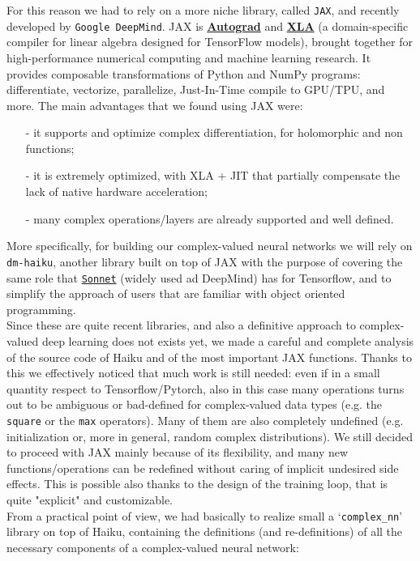 \documentclass[../main.tex]{subfiles}
\begin{document}
For this reason we had to rely on a more niche library, called \texttt{JAX}, and recently developed by \texttt{Google DeepMind}. JAX is \href{https://github.com/hips/autograd}{\textbf{Autograd}} and \href{https://www.tensorflow.org/xla}{\textbf{XLA}} (a domain-specific compiler for linear algebra designed for TensorFlow models), brought together for high-performance numerical computing and machine learning research. It provides composable transformations of Python and NumPy programs: differentiate, vectorize, parallelize, Just-In-Time compile to GPU/TPU, and more. The main advantages that we found using JAX were:
\begin{itemize}
	\item[-] it supports and optimize complex differentiation, for holomorphic and non functions;
	\item[-] it is extremely optimized, with XLA + JIT that partially compensate the lack of native hardware acceleration;
	\item[-] many complex operations/layers are already supported and well defined.
\end{itemize}
More specifically, for building our complex-valued neural networks we will rely on \texttt{dm-haiku}, another library built on top of JAX with the purpose of covering the same role that \href{https://github.com/deepmind/sonnet}{\texttt{Sonnet}} (widely used ad DeepMind) has for Tensorflow, and to simplify the approach of users that are familiar with object oriented programming.\\
Since these are quite recent libraries, and also a definitive approach to complex-valued deep learning does not exists yet, we made a careful and complete analysis of the source code of Haiku and of the most important JAX functions. Thanks to this we effectively noticed that much work is still needed: even if in a small quantity respect to Tensorflow/Pytorch, also in this case many operations turns out to be ambiguous or bad-defined for complex-valued data types (e.g. the \texttt{square} or the \texttt{max} operators). Many of them are also completely undefined (e.g. initialization or, more in general, random complex distributions). We still decided to proceed with JAX mainly because of its flexibility, and many new functions/operations can be redefined without caring of implicit undesired side effects. This is possible also thanks to the design of the training loop, that is quite "explicit" and customizable.\\
From a practical point of view, we had basically to realize small a `\texttt{complex\_nn}' library on top of Haiku, containing the definitions (and re-definitions) of all the necessary components of a complex-valued neural network:
\end{document}
